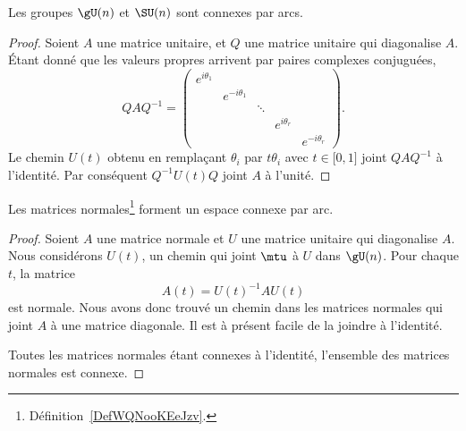 \begin{lemma}       \label{LEMooQMXHooZQozMK}
	Les groupes \( \gU(n)\) et \( \SU(n)\) sont connexes par arcs.
\end{lemma}

\begin{proof}
	Soient \( A\) une matrice unitaire, et \( Q\) une matrice unitaire qui diagonalise \( A\). Étant donné que les valeurs propres arrivent par paires complexes conjuguées,
	\begin{equation}
		QAQ^{-1}=\begin{pmatrix}
			e^{i\theta_1} &                &        &               &                \\
			              & e^{-i\theta_1} &        &               &                \\
			              &                & \ddots &               &                \\
			              &                &        & e^{i\theta_r} &                \\
			              &                &        &               & e^{-i\theta_r}
		\end{pmatrix}.
	\end{equation}
	Le chemin \( U(t)\) obtenu en remplaçant \( \theta_i\) par \( t\theta_i\) avec \( t\in\mathopen[ 0 , 1 \mathclose]\) joint \( QAQ^{-1}\) à l'identité. Par conséquent \( Q^{-1}U(t)Q\) joint \( A\) à l'unité.
\end{proof}


\begin{theorem}
	Les matrices normales\footnote{Définition~\ref{DefWQNooKEeJzv}.} forment un espace connexe par arc.
\end{theorem}

\begin{proof}
	Soient \( A\) une matrice normale et \( U\) une matrice unitaire qui diagonalise \( A\). Nous considérons \( U(t)\), un chemin qui joint \( \mtu\) à \( U\) dans \( \gU(n)\). Pour chaque \( t\), la matrice
	\begin{equation}
		A(t)=U(t)^{-1} AU(t)
	\end{equation}
	est normale. Nous avons donc trouvé un chemin dans les matrices normales qui joint \( A\) à une matrice diagonale. Il est à présent facile de la joindre à l'identité.

	Toutes les matrices normales étant connexes à l'identité, l'ensemble des matrices normales est connexe.
\end{proof}

